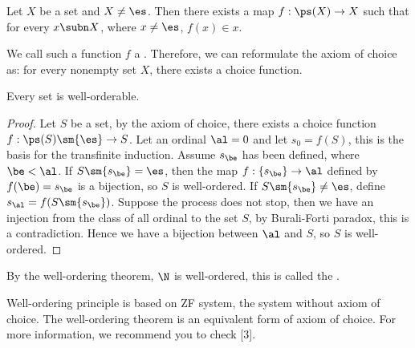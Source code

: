 \documentclass[10pt]{article}
\begin{document}
\begin{Axiom of choice}
    Let $X$ be a set and $X\ne\es$. Then there exists a map $f:\ps(X)\to X$ such that for every $x\subn X$, where $x\ne\es$, $f(x)\in x$. 
\end{Axiom of choice}
\par
We call such a function $f$ a . Therefore, we can reformulate the axiom of choice as: for every nonempty set $X$, there exists a choice function.
\begin{theorem}
    Every set is well-orderable.
\end{theorem}
\begin{proof}
    Let $S$ be a set, by the axiom of choice, there exists a choice function $f:\ps(S)\sm\{\es\}\to S$. Let an ordinal $\al=0$ and let ${s}_{0}=f(S)$, this is the basis for the transfinite induction. Assume ${s}_{\be}$ has been defined, where $\be<\al$. If $S\sm\{{s}_{\be}\}=\es$, then the map $f:\{{s}_{\be}\}\to\al$ defined by $f(\be)={s}_{\be}$ is a bijection, so $S$ is well-ordered. If $S\sm\{{s}_{\be}\}\ne\es$, define ${s}_{\al}=f(S\sm\{{s}_{\be}\})$. Suppose the process does not stop, then we have an injection from the class of all ordinal to the set $S$, by Burali-Forti paradox, this is a contradiction. Hence we have a bijection between $\al$ and $S$, so $S$ is well-ordered.
\end{proof}
\par
By the well-ordering theorem, $\N$ is well-ordered, this is called the .
\begin{remark}
    Well-ordering principle is based on ZF system, the system without axiom of choice. The well-ordering theorem is an equivalent form of axiom of choice. For more information, we recommend you to check [3].
\end{remark}
\end{document}
